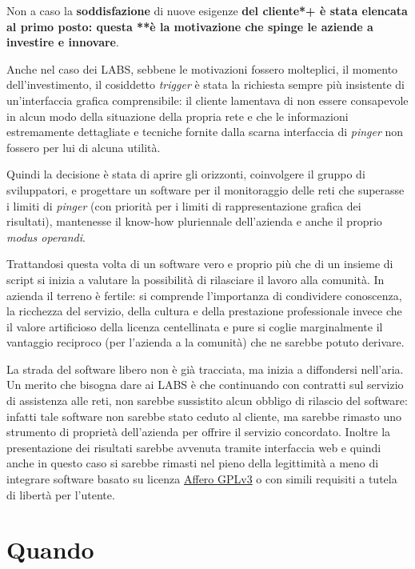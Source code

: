 \documentclass[a4wide,10pt,italian]{manual}
\begin{document}
Non a caso la \textbf{soddisfazione} di nuove esigenze \textbf{del cliente*+ è stata elencata al primo posto:
questa **è la motivazione che spinge le aziende a investire e innovare}.

Anche nel caso dei LABS, sebbene le motivazioni fossero molteplici, il momento dell'investimento,
il cosiddetto \emph{trigger} è stata la richiesta sempre più insistente di un'interfaccia grafica
comprensibile: il cliente lamentava di non essere consapevole in alcun modo della situazione della propria rete
e che le informazioni estremamente dettagliate e tecniche fornite dalla scarna interfaccia di \emph{pinger}
non fossero per lui di alcuna utilità.

Quindi la decisione è stata di aprire gli orizzonti, coinvolgere il gruppo di sviluppatori,
e progettare un software per il monitoraggio delle reti che superasse i limiti di \emph{pinger}
(con priorità per i limiti di rappresentazione grafica dei risultati),
mantenesse il know-how pluriennale dell'azienda e anche il proprio \emph{modus operandi}.

Trattandosi questa volta di un software vero e proprio più che di un insieme di script
si inizia a valutare la possibilità di rilasciare il lavoro alla comunità.
In azienda il terreno è fertile: si comprende l'importanza di condividere conoscenza,
la ricchezza del servizio, della cultura e della prestazione professionale
invece che il valore artificioso della licenza centellinata
e pure si coglie marginalmente il vantaggio reciproco (per l'azienda a la comunità) che ne sarebbe potuto derivare.

La strada del software libero non è già tracciata, ma inizia a diffondersi nell'aria.
Un merito che bisogna dare ai LABS è che continuando con contratti sul servizio di assistenza alle reti,
non sarebbe sussistito alcun obbligo di rilascio del software:
infatti tale software non sarebbe stato ceduto al cliente, ma sarebbe rimasto
uno strumento di proprietà dell'azienda per offrire il servizio concordato.
Inoltre la presentazione dei risultati sarebbe avvenuta tramite interfaccia web
e quindi anche in questo caso si sarebbe rimasti nel pieno della legittimità
a meno di integrare software basato su licenza \href{http://www.fsf.org}{Affero GPLv3} o
con simili requisiti a tutela di libertà per l'utente.


\section{Quando}
\end{document}
